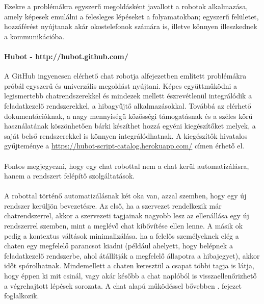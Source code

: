 Ezekre a problémákra egyszerű megoldásként javallott a robotok alkalmazása, amely képesek emulálni a felesleges lépéseket a folyamatokban; egyszerű felületet, hozzáférést nyújtanak akár okostelefonok számára is, illetve könnyen illeszkednek a kommunikációba.

\paragraph{Hubot - http://hubot.github.com/} A GitHub ingyenesen elérhető chat robotja  alfejezetben említett problémákra próbál egyszerű és univerzális megoldást nyújtani. Képes együttműködni a legismertebb chatrendszerekkel és mindezek mellett észrevétlenül integrálódik a feladatkezelő rendszerekkel, a hibagyűjtő alkalmazásokkal. Továbbá az elérhető dokumentációknak, a nagy mennyiségű közösségi támogatásnak és a széles körű használatának köszönhetően bárki készíthet hozzá egyéni kiegészítőket melyek, a saját belső rendszerekkel is könnyen integrálódhatnak. A kiegészítők hivatalos gyűjteménye a \url{https://hubot-script-catalog.herokuapp.com/} címen érhető el.\\
\hfill\\
Fontos megjegyezni, hogy egy chat robottal nem a chat kerül automatizálásra, hanem a rendszert felépítő szolgáltatások.\\
\hfill\\
A robottal történő automatizálásnak két oka van, azzal szemben, hogy egy új rendszer kerüljön bevezetésre.
Az első, ha a szervezet rendelkezik már chatrendszerrel, akkor a szervezeti tagjainak nagyobb lesz az ellenállása egy új rendszerrel szemben, mint a meglévő chat kibővítése ellen lenne.
A másik ok pedig a kontextus váltások minimalizálása. ha a felelős személyeknek elég a chaten egy megfelelő parancsot kiadni (például ahelyett, hogy belépnek a feladatkezelő rendszerbe, ahol átállítják a megfelelő állapotra a hibajegyet), akkor időt spórolhatnak. Mindemellett a chaten keresztül a csapat többi tagja is látja, hogy éppen ki mit csinál, vagy akár később a chat naplóból is visszaellenőrizhető a végrehajtott lépések sorozata. A chat alapú működéssel bővebben . fejezet foglalkozik.
